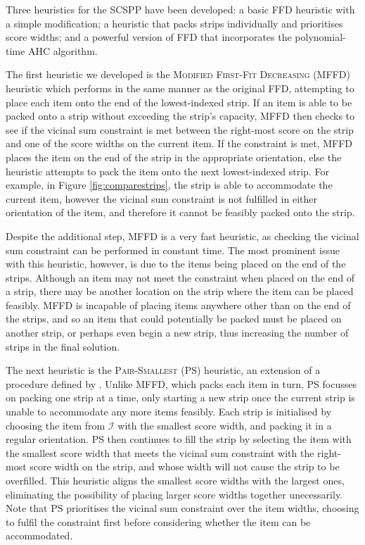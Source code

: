 \documentclass[oribibl]{llncs}
\begin{document}
Three heuristics for the SCSPP have been developed: a basic FFD heuristic with a simple modification; a heuristic that packs strips individually and prioritises score widths; and a powerful version of FFD that incorporates the polynomial-time AHC algorithm.

The first heuristic we developed is the \textsc{Modified First-Fit Decreasing} (MFFD) heuristic which performs in the same manner as the original FFD, attempting to place each item onto the end of the lowest-indexed strip. If an item is able to be packed onto a strip without exceeding the strip's capacity, MFFD then checks to see if the vicinal sum constraint is met between the right-most score on the strip and one of the score widths on the current item. If the constraint is met, MFFD places the item on the end of the strip in the appropriate orientation, else the heuristic attempts to pack the item onto the next lowest-indexed strip. For example, in Figure \ref{fig:comparestrips}, the strip is able to accommodate the current item, however the vicinal sum constraint is not fulfilled in either orientation of the item, and therefore it cannot be feasibly packed onto the strip.

Despite the additional step, MFFD is a very fast heuristic, as checking the vicinal sum constraint can be performed in constant time. The most prominent issue with this heuristic, however, is due to the items being placed on the end of the strips. Although an item may not meet the constraint when placed on the end of a strip, there may be another location on the strip where the item can be placed feasibly. MFFD is incapable of placing items anywhere other than on the end of the strips, and so an item that could potentially be packed must be placed on another strip, or perhaps even begin a new strip, thus increasing the number of strips in the final solution.

The next heuristic is the \textsc{Pair-Smallest} (PS) heuristic, an extension of a procedure defined by \cite{lewis2011}. Unlike MFFD, which packs each item in turn, PS focusses on packing one strip at a time, only starting a new strip once the current strip is unable to accommodate any more items feasibly. Each strip is initialised by choosing the item from $\mathcal{I}$ with the smallest score width, and packing it in a regular orientation. PS then continues to fill the strip by selecting the item with the smallest score width that meets the vicinal sum constraint with the right-most score width on the strip, and whose width will not cause the strip to be overfilled. This heuristic aligns the smallest score widths with the largest ones, eliminating the possibility of placing larger score widths together unecessarily. Note that PS prioritises the vicinal sum constraint over the item widths, choosing to fulfil the constraint first before considering whether the item can be accommodated.
\end{document}
